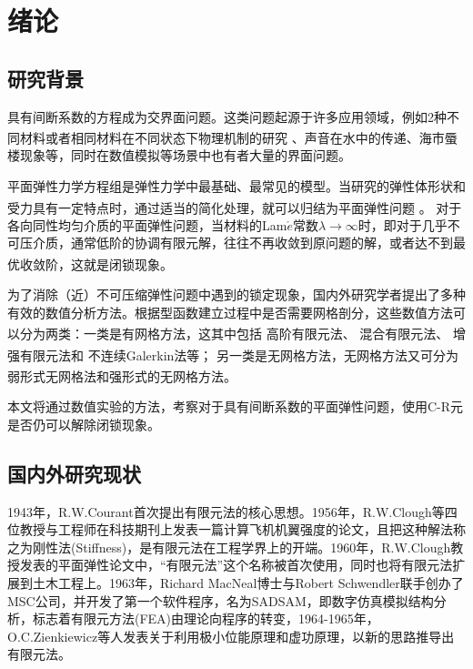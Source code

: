 \documentclass[a4paper,UTF8,titlepage]{ctexart}
\begin{document}
\newpage

\tableofcontents

\newpage

\section{绪论}

\subsection{研究背景}

具有间断系数的方程成为交界面问题。这类问题起源于许多应用领域，例如2种不同材料或者相同材料在不同状态下物理机制的研究 \textsuperscript{\cite{邵文婷2017求解一类交界面问题的模态基函数谱元法数值实验}}、声音在水中的传递、海市蜃楼现象等，同时在数值模拟等场景中也有者大量的界面问题。

平面弹性力学方程组是弹性力学中最基础、最常见的模型。当研究的弹性体形状和受力具有一定特点时，通过适当的简化处理，就可以归结为平面弹性问题 \textsuperscript{\cite{王兆清2018不可压缩平面问题的位移}}。
对于各向同性均匀介质的平面弹性问题，当材料的Lam$\acute{e}$常数$\lambda \to \infty$时，即对于几乎不可压介质，通常低阶的协调有限元解，往往不再收敛到原问题的解，或者达不到最优收敛阶，这就是闭锁现象\textsuperscript{\cite{陈绍春2007平面弹性的一个新的}}。

为了消除（近）不可压缩弹性问题中遇到的锁定现象，国内外研究学者提出了多种有效的数值分析方法。根据型函数建立过程中是否需要网格剖分，这些数值方法可以分为两类：一类是有网格方法，这其中包括
高阶有限元法\textsuperscript{\cite{peet2014legendre}}、
混合有限元法\textsuperscript{\cite{masud2011variational}}、
增强有限元法\textsuperscript{\cite{auricchio2005analysis}}和
不连续Galerkin法\textsuperscript{\cite{hansbo2003discontinuous}}等；
另一类是无网格方法，无网格方法又可分为弱形式无网格法和强形式的无网格方法\textsuperscript{\cite{王兆清2018不可压缩平面问题的位移}}。

本文将通过数值实验的方法，考察对于具有间断系数的平面弹性问题，使用C-R元是否仍可以解除闭锁现象。

\subsection{国内外研究现状}

1943年，R.W.Courant首次提出有限元法的核心思想。1956年，R.W.Clough等四位教授与工程师在科技期刊上发表一篇计算飞机机翼强度的论文，且把这种解法称之为刚性法(Stiffness)，是有限元法在工程学界上的开端。1960年，R.W.Clough教授发表的平面弹性论文中，“有限元法”这个名称被首次使用，同时也将有限元法扩展到土木工程上。1963年，Richard MacNeal博士与Robert Schwendler联手创办了MSC公司，并开发了第一个软件程序，名为SADSAM，即数字仿真模拟结构分析，标志着有限元方法(FEA)由理论向程序的转变，1964-1965年，O.C.Zienkiewicz等人发表关于利用极小位能原理和虚功原理，以新的思路推导出有限元法。
\end{document}
